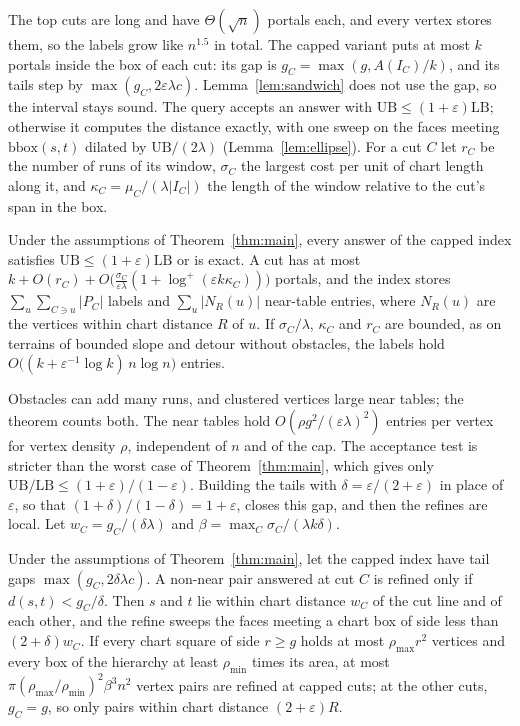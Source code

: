 \documentclass[sigconf,nonacm,screen]{acmart}
\newcommand{\LB}{\mathrm{LB}}
\newcommand{\UB}{\mathrm{UB}}
\newcommand{\eps}{\varepsilon}
\begin{document}
The top cuts are long and have $\Theta(\sqrt n)$ portals each, and every vertex stores them, so the labels
grow like $n^{1.5}$ in total. The capped variant puts at most $k$ portals inside the box of each cut: its gap
is $g_C=\max(g,A(I_C)/k)$, and its tails step by $\max(g_C,2\eps\lambda c)$. Lemma~\ref{lem:sandwich} does not
use the gap, so the interval stays sound. The query accepts an answer with $\UB\le(1+\eps)\LB$; otherwise it
computes the distance exactly, with one sweep on the faces meeting $\mathrm{bbox}(s,t)$ dilated by $\UB/(2\lambda)$
(Lemma~\ref{lem:ellipse}). For a cut $C$ let $r_C$ be the number of runs of its window, $\sigma_C$ the largest cost
per unit of chart length along it, and $\kappa_C=\mu_C/(\lambda|I_C|)$ the length of the window relative to the
cut's span in the box.
\begin{theorem}
\label{thm:capped}
Under the assumptions of Theorem~\ref{thm:main}, every answer of the capped index satisfies $\UB\le(1+\eps)\LB$ or
is exact. A cut has at most
$k+O(r_C)+O\big(\frac{\sigma_C}{\eps\lambda}(1+\log^+(\eps k\kappa_C))\big)$ portals, and the index stores
$\sum_u\sum_{C\ni u}|P_C|$ labels and $\sum_u|N_R(u)|$ near-table entries, where $N_R(u)$ are the vertices within
chart distance $R$ of $u$. If $\sigma_C/\lambda$, $\kappa_C$ and $r_C$ are bounded, as on terrains of bounded
slope and detour without obstacles, the labels hold $O\big((k+\eps^{-1}\log k)\,n\log n\big)$ entries.
\end{theorem}
Obstacles can add many runs, and clustered vertices large near tables; the theorem counts both. The near tables
hold $O(\rho g^2/(\eps\lambda)^2)$ entries per vertex for vertex density $\rho$, independent of $n$ and of the cap.
The acceptance test is stricter than the worst case of Theorem~\ref{thm:main}, which gives only
$\UB/\LB\le(1+\eps)/(1-\eps)$. Building the tails with $\delta=\eps/(2+\eps)$ in place of $\eps$, so that
$(1+\delta)/(1-\delta)=1+\eps$, closes this gap, and then the refines are local. Let
$w_C=g_C/(\delta\lambda)$ and $\beta=\max_C\sigma_C/(\lambda k\delta)$.
\begin{theorem}
\label{thm:locality}
Under the assumptions of Theorem~\ref{thm:main}, let the capped index have tail gaps $\max(g_C,2\delta\lambda c)$.
A non-near pair answered at cut $C$ is refined only if $d(s,t)<g_C/\delta$. Then $s$ and $t$ lie within chart
distance $w_C$ of the cut line and of each other, and the refine sweeps the faces meeting a chart box of side less
than $(2+\delta)w_C$. If every chart square of side $r\ge g$ holds at most $\rho_{\max}r^2$ vertices and every box
of the hierarchy at least $\rho_{\min}$ times its area, at most $\pi(\rho_{\max}/\rho_{\min})^2\beta^3n^2$ vertex
pairs are refined at capped cuts; at the other cuts, $g_C=g$, so only pairs within chart distance $(2+\eps)R$.
\end{theorem}
\end{document}
